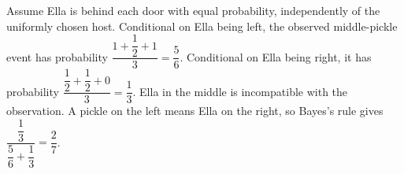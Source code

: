 Assume Ella is behind each door with equal probability, independently of the uniformly chosen host. Conditional on Ella being left, the observed middle-pickle event has probability $\dfrac{1+\dfrac{1}{2}+1}{3}=\dfrac{5}{6}$. Conditional on Ella being right, it has probability $\dfrac{\dfrac{1}{2}+\dfrac{1}{2}+0}{3}=\dfrac{1}{3}$. Ella in the middle is incompatible with the observation. A pickle on the left means Ella on the right, so Bayes's rule gives $\dfrac{\dfrac{1}{3}}{\dfrac{5}{6}+\dfrac{1}{3}}=\boxed{\dfrac{2}{7}}$.

